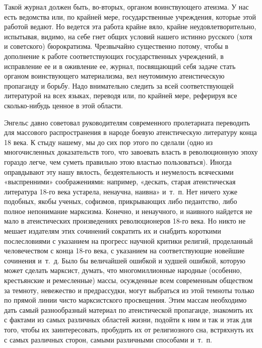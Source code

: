 \documentclass[twoside]{article}
\begin{document}
Такой журнал должен быть, во-вторых, органом воинствующего атеизма. У нас
есть ведомства или, по крайней мере, государственные учреждения, которые
этой работой ведают. Но ведется эта работа крайне вяло, крайне
неудовлетворительно, испытывая, видимо, на себе гнет общих условий нашего
истинно русского (хотя и советского) бюрократизма. Чрезвычайно существенно
потому, чтобы в дополнение к работе соответствующих государственных
учреждений, в исправление ее и в оживление ее, журнал, посвящающий себя
задаче стать органом воинствующего материализма, вел неутомимую
атеистическую пропаганду и борьбу. Надо внимательно следить за всей
соответствующей литературой на всех языках, переводя или, по крайней мере,
реферируя все сколько-нибудь ценное в этой области.

Энгельс давно советовал руководителям современного пролетариата переводить
для массового распространения в народе боевую атеистическую литературу
конца 18 века. К стыду нашему, мы до сих пор этого по сделали (одно из
многочисленных доказательств того, что завоевать власть в революционную
эпоху гораздо легче, чем суметь правильно этою властью пользоваться).
Иногда оправдывают эту нашу вялость, бездеятельность и неумелость
всяческими «выспренними» соображениями: например, «дескать, старая
атеистическая литература 18-го века устарела, ненаучна, наивна» и~т.~п. Нет
ничего хуже подобных, якобы ученых, софизмов, прикрывающих либо педантство,
либо полное непонимание марксизма. Конечно, и ненаучного, и наивного
найдется не мало в атеистических произведениях революционеров 18-го века.
Но никто не мешает издателям этих сочинений сократить их и снабдить
короткими послесловиями с указанием на прогресс научной критики религий,
проделанный человечеством с конца 18-го века, с указанием на
соответствующие новейшие сочинения и~т.~д. Было бы величайшей ошибкой и
худшей ошибкой, которую может сделать марксист, думать, что многомиллионные
народные (особенно, крестьянские и ремесленные) массы, осужденные всем
современным обществом за темноту, невежество и предрассудки, могут
выбраться из этой темноты только по прямой линии чисто марксистского
просвещения. Этим массам необходимо дать самый разнообразный материал по
атеистической пропаганде, знакомить их с фактами из самых различных
областей жизни, подойти к ним и так и этак для того, чтобы их
заинтересовать, пробудить их от религиозного сна, встряхнуть их с самых
различных сторон, самыми различными способами и~т.~п.
\end{document}
